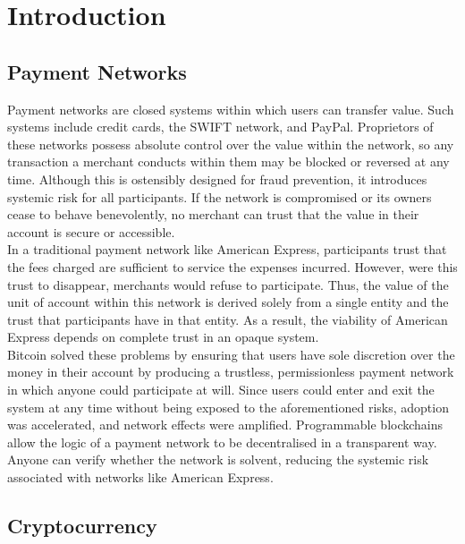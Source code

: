 \section{Introduction}

\subsection{Payment Networks}

\noindent Payment networks are closed systems within which users can transfer value. Such systems include credit cards, the SWIFT network, and PayPal. Proprietors of these networks possess absolute control over the value within the network, so any transaction a merchant conducts within them may be blocked or reversed at any time. Although this is ostensibly designed for fraud prevention, it introduces systemic risk for all participants. If the network is compromised or its owners cease to behave benevolently, no merchant can trust that the value in their account is secure or accessible. \\

\noindent In a traditional payment network like American Express, participants trust that the fees charged are sufficient to service the expenses incurred. However, were this trust to disappear, merchants would refuse to participate. Thus, the value of the unit of account within this network is derived solely from a single entity and the trust that participants have in that entity. As a result, the viability of American Express depends on complete trust in an opaque system.  \\

\noindent Bitcoin solved these problems by ensuring that users have sole discretion over the money in their account by producing a trustless, permissionless payment network in which anyone could participate at will. Since users could enter and exit the system at any time without being exposed to the aforementioned risks, adoption was accelerated, and network effects were amplified. Programmable blockchains allow the logic of a payment network to be decentralised in a transparent way. Anyone can verify whether the network is solvent, reducing the systemic risk associated with networks like American Express. 

\subsection{Cryptocurrency}

